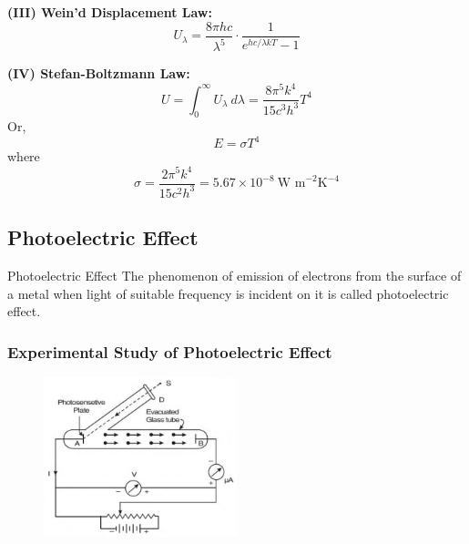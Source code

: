 \documentclass[12pt]{article}
\numberwithin{equation}{subsection}
\begin{document}
\textbf{(III) Wein'd Displacement Law:} \\
\begin{equation}
    U_{\lambda} = \frac{8\pi hc}{\lambda^5} \cdot \frac{1}{e^{hc /\lambda kT} - 1}
\end{equation}

\textbf{(IV) Stefan-Boltzmann Law:} \\
\begin{equation}
    U = \int_{0}^{\infty} U_{\lambda} \: d\lambda = \frac{8\pi^5 k^4}{15c^3 h^3} T^4
\end{equation}
Or,
\begin{equation}
    E = \sigma T^4
\end{equation}
where \[
    \sigma = \frac{2\pi^5 k^4}{15c^2 h^3} = 5.67 \times 10^{-8} \: \text{W m}^{-2} \text{K}^{-4}
\]


\subsection{Photoelectric Effect}
\begin{definition}{Photoelectric Effect}{}
    The phenomenon of emission of electrons from the surface of a metal when light of suitable frequency is incident on it is called photoelectric effect.
\end{definition}

\subsubsection{Experimental Study of Photoelectric Effect}
\begin{figure}[htpb]
    \centering
    \includegraphics[width=0.5\textwidth]{photoelectric effect.png}
\end{figure}
\end{document}
